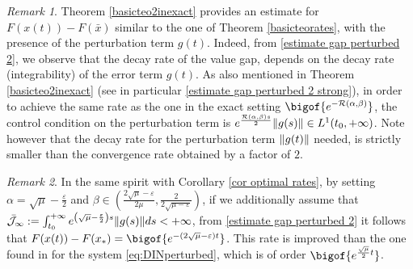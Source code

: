\documentclass[reqno]{amsart}
\theoremstyle{plain}
\theoremstyle{definition}
\theoremstyle{remark}
\newtheorem{remark}{Remark}	%
\DeclarePairedDelimiter{\norm}{\lVert}{\rVert}	%
\newcommand{\Jb}{\mathcal{J}}
\newcommand{\Rb}{\mathcal{R}}
\begin{document}
\begin{remark}
	Theorem \ref{basicteo2inexact} provides an estimate for $F(x(t))-F(\bar{x})$ similar to the one of Theorem  \ref{basicteorates}, with the presence of the perturbation term $g(t)$. Indeed, from \eqref{estimate gap perturbed 2}, we observe that the decay rate of the value gap, depends on the decay rate (integrability) of the error term $g(t)$. As also mentioned in Theorem \ref{basicteo2inexact} (see in particular \eqref{estimate gap perturbed 2 strong}), in order to achieve the same rate as the one in the exact setting $\bigof{e^{-\Rb(\alpha,\beta)}}$, the control condition on the perturbation term is  $e^{\frac{\Rb(\alpha,\beta)s}{2}}\norm{g(s)} \in L^{1}(t_{0},+\infty)$. Note however that the decay rate for the perturbation term $\norm{g(t)}$ needed, is strictly smaller than the convergence rate obtained by a factor of $2$.
\end{remark}
\begin{remark}
In the same spirit with Corollary \ref{cor optimal rates}, by setting $\alpha =\sqrt{\mu}-\frac{\varepsilon}{2}$ and $\beta\in\left(\frac{2\sqrt{\mu}-\varepsilon}{2\mu},\frac{2}{2\sqrt{\mu-\varepsilon}}\right)$, if we additionally assume that  $\bar{\Jb}_{\infty}:=\int_{t_{0}}^{+\infty}e^{\left(\sqrt{\mu}-\frac{\varepsilon}{2}\right)s}\norm{g(s)}ds <+\infty$, from \eqref{estimate gap perturbed 2} it follows that $	F(x(t))- F(x_{\ast}) = \bigof{e^{-(2\sqrt{\mu}-\varepsilon)t}}$. This rate is improved than the one found in \cite{attouch2021effect} for the system \ref{eq:DINperturbed}, which is of order  $\bigof{e^{\frac{\sqrt{\mu}}{2}t}}$.
\end{remark}
\end{document}
